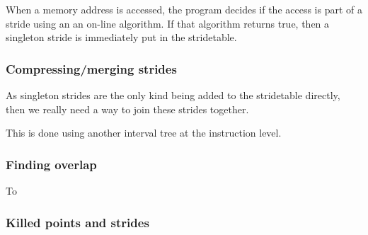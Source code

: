 \documentclass[12pt,twoside]{reedthesis}
\begin{document}
		When a memory address is accessed, the program decides if the access is part of a stride using an an on-line algorithm. If that algorithm returns true, then a singleton stride is immediately put in the stridetable.

		\subsubsection{Compressing/merging strides}

		As singleton strides are the only kind being added to the stridetable directly, then we really need a way to join these strides together.

		This is done using another interval tree at the instruction level.


		\subsubsection{Finding overlap}

		To

		\subsubsection{Killed points and strides}






\end{document}
